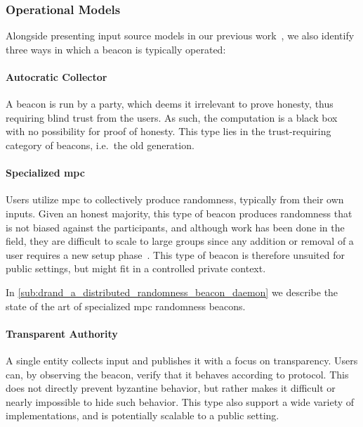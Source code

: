\subsubsection{Operational Models}
Alongside presenting input source models in our previous work~\cite{worldsbestpaper}, we also identify three ways in which a beacon is typically operated:

\paragraph{Autocratic Collector}
A beacon is run by a party, which deems it irrelevant to prove honesty, thus requiring blind trust from the users.
As such, the computation is a black box with no possibility for proof of honesty.
This type lies in the trust-requiring category of beacons, i.e.\ the old generation.

\paragraph{Specialized \acrshort{mpc}}
Users utilize \acrfull{mpc} to collectively produce randomness, typically from their own inputs.
Given an honest majority, this type of beacon produces randomness that is not biased against the participants, and although work has been done in the field, they are difficult to scale to large groups since any addition or removal of a user requires a new setup phase~\cite{cascudo2017scrape, syta2017scalable}.
This type of beacon is therefore unsuited for public settings, but might fit in a controlled private context.

In \vref{sub:drand_a_distributed_randomness_beacon_daemon} we describe the state of the art of specialized \gls{mpc} randomness beacons.

\paragraph{Transparent Authority}
A single entity collects input and publishes it with a focus on transparency.
Users can, by observing the beacon, verify that it behaves according to protocol.
This does not directly prevent byzantine behavior, but rather makes it difficult or nearly impossible to hide such behavior.
This type also support a wide variety of implementations, and is potentially scalable to a public setting.


